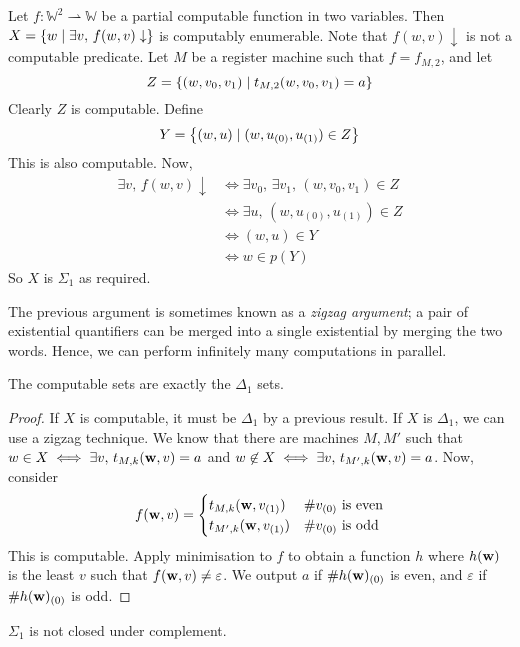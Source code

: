 \begin{example}
	Let \( f \colon \mathbb W^2 \rightharpoonup \mathbb W \) be a partial computable function in two variables.
	Then \( X = \qty{w \mid \exists v,\, f(w, v) \downarrow} \) is computably enumerable.
	Note that \( f(w, v) \downarrow \) is not a computable predicate.
	Let \( M \) be a register machine such that \( f = f_{M,2} \), and let
	\[ Z = \qty{(w, v_0, v_1) \mid t_{M,2}(w,v_0,v_1) = a} \]
	Clearly \( Z \) is computable.
	Define
	\[ Y = \qty{(w, u) \mid (w, u_{(0)}, u_{(1)}) \in Z} \]
	This is also computable.
	Now,
	\begin{align*}
		\exists v,\, f(w,v) \downarrow &\iff \exists v_0,\, \exists v_1,\, (w,v_0,v_1) \in Z \\
		&\iff \exists u,\, (w,u_{(0)},u_{(1)}) \in Z \\
		&\iff (w,u) \in Y \\
		&\iff w \in p(Y)
	\end{align*}
	So \( X \) is \( \Sigma_1 \) as required.
\end{example}
\begin{remark}
	The previous argument is sometimes known as a \emph{zigzag argument}; a pair of existential quantifiers can be merged into a single existential by merging the two words.
	Hence, we can perform infinitely many computations in parallel.
\end{remark}
\begin{corollary}
	The computable sets are exactly the \( \Delta_1 \) sets.
\end{corollary}
\begin{proof}
	If \( X \) is computable, it must be \( \Delta_1 \) by a previous result.
	If \( X \) is \( \Delta_1 \), we can use a zigzag technique.
	We know that there are machines \( M, M' \) such that \( w \in X \iff \exists v,\, t_{M,k}(\vb w, v) = a \) and \( w \not\in X \iff \exists v,\, t_{M',k}(\vb w, v) = a \).
	Now, consider
	\[ f(\vb w, v) = \begin{cases}
		t_{M,k}(\vb w, v_{(1)}) & \#v_{(0)} \text{ is even} \\
		t_{M',k}(\vb w, v_{(1)}) & \#v_{(0)} \text{ is odd}
	\end{cases} \]
	This is computable.
	Apply minimisation to \( f \) to obtain a function \( h \) where \( h(\vb w) \) is the least \( v \) such that \( f(\vb w, v) \neq \varepsilon \).
	We output \( a \) if \( \#h(\vb w)_{(0)} \) is even, and \( \varepsilon \) if \( \#h(\vb w)_{(0)} \) is odd.
\end{proof}
\begin{corollary}
	\( \Sigma_1 \) is not closed under complement.
\end{corollary}
